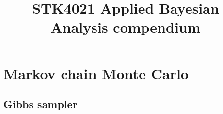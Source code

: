 \documentclass{article}
\title{STK4021 Applied Bayesian Analysis compendium}
\begin{document}
    \maketitle

    \tableofcontents

    \section{Markov chain Monte Carlo}

        \subsection{Gibbs sampler}
\end{document}
